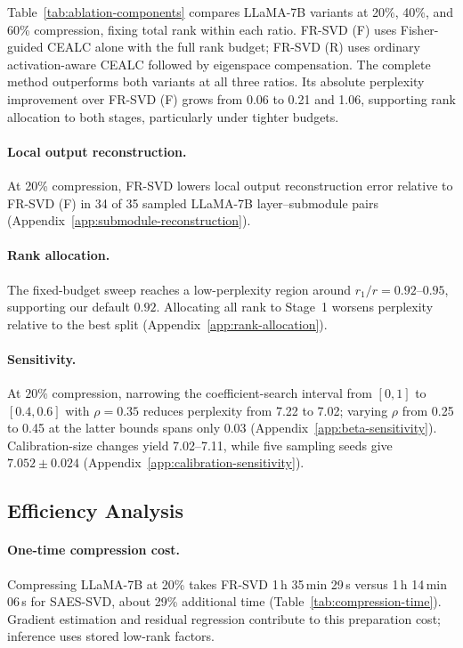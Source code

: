 \documentclass[11pt]{article}
\begin{document}
Table~\ref{tab:ablation-components} compares LLaMA-7B variants at 20\%, 40\%, and 60\% compression, fixing total rank within each ratio. FR-SVD (F) uses Fisher-guided CEALC alone with the full rank budget; FR-SVD (R) uses ordinary activation-aware CEALC followed by eigenspace compensation. The complete method outperforms both variants at all three ratios. Its absolute perplexity improvement over FR-SVD (F) grows from 0.06 to 0.21 and 1.06, supporting rank allocation to both stages, particularly under tighter budgets.



\paragraph{Local output reconstruction.}
At 20\% compression, FR-SVD lowers local output reconstruction error relative to FR-SVD (F) in 34 of 35 sampled LLaMA-7B layer--submodule pairs (Appendix~\ref{app:submodule-reconstruction}).

\paragraph{Rank allocation.}
The fixed-budget sweep reaches a low-perplexity region around $r_1/r=0.92$--$0.95$, supporting our default $0.92$. Allocating all rank to Stage~1 worsens perplexity relative to the best split (Appendix~\ref{app:rank-allocation}).

\paragraph{Sensitivity.}
At $20\%$ compression, narrowing the coefficient-search interval from $[0,1]$ to $[0.4,0.6]$ with $\rho=0.35$ reduces perplexity from 7.22 to 7.02; varying $\rho$ from 0.25 to 0.45 at the latter bounds spans only 0.03 (Appendix~\ref{app:beta-sensitivity}). Calibration-size changes yield 7.02--7.11, while five sampling seeds give $7.052\pm0.024$ (Appendix~\ref{app:calibration-sensitivity}).

\subsection{Efficiency Analysis}\label{sec:efficiency}

\paragraph{One-time compression cost.}
Compressing LLaMA-7B at 20\% takes FR-SVD 1\,h 35\,min 29\,s versus 1\,h 14\,min 06\,s for SAES-SVD, about 29\% additional time (Table~\ref{tab:compression-time}). Gradient estimation and residual regression contribute to this preparation cost; inference uses stored low-rank factors.
\end{document}
